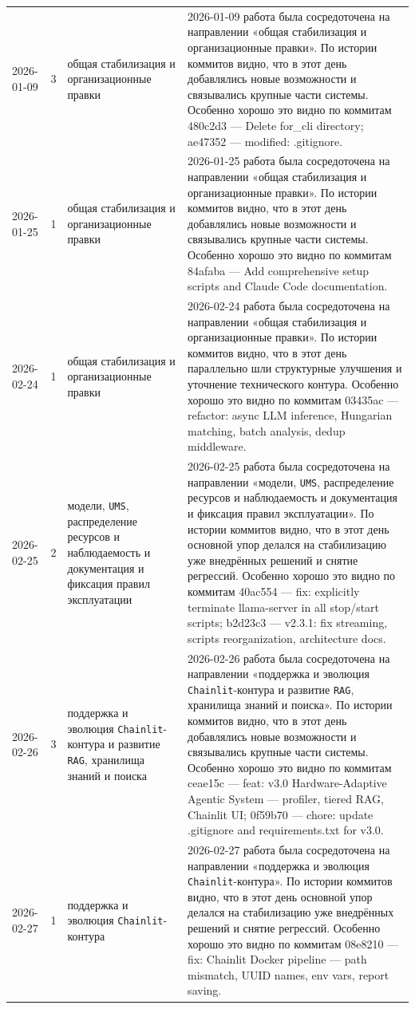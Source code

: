 \begin{longtable}{p{} p{} p{} p{}}
2026-01-09 & 3 & общая стабилизация и организационные правки & 2026-01-09 работа была сосредоточена на направлении «общая стабилизация и организационные правки». По истории коммитов видно, что в этот день добавлялись новые возможности и связывались крупные части системы. Особенно хорошо это видно по коммитам 480c2d3 — Delete for\_cli directory; ae47352 — modified:   .gitignore. \\
2026-01-25 & 1 & общая стабилизация и организационные правки & 2026-01-25 работа была сосредоточена на направлении «общая стабилизация и организационные правки». По истории коммитов видно, что в этот день добавлялись новые возможности и связывались крупные части системы. Особенно хорошо это видно по коммитам 84afaba — Add comprehensive setup scripts and Claude Code documentation. \\
2026-02-24 & 1 & общая стабилизация и организационные правки & 2026-02-24 работа была сосредоточена на направлении «общая стабилизация и организационные правки». По истории коммитов видно, что в этот день параллельно шли структурные улучшения и уточнение технического контура. Особенно хорошо это видно по коммитам 03435ac — refactor: async LLM inference, Hungarian matching, batch analysis, dedup middleware. \\
2026-02-25 & 2 & модели, \texttt{UMS}, распределение ресурсов и наблюдаемость и документация и фиксация правил эксплуатации & 2026-02-25 работа была сосредоточена на направлении «модели, \texttt{UMS}, распределение ресурсов и наблюдаемость и документация и фиксация правил эксплуатации». По истории коммитов видно, что в этот день основной упор делался на стабилизацию уже внедрённых решений и снятие регрессий. Особенно хорошо это видно по коммитам 40ac554 — fix: explicitly terminate llama-server in all stop/start scripts; b2d23c3 — v2.3.1: fix streaming, scripts reorganization, architecture docs. \\
2026-02-26 & 3 & поддержка и эволюция \texttt{Chainlit}-контура и развитие \texttt{RAG}, хранилища знаний и поиска & 2026-02-26 работа была сосредоточена на направлении «поддержка и эволюция \texttt{Chainlit}-контура и развитие \texttt{RAG}, хранилища знаний и поиска». По истории коммитов видно, что в этот день добавлялись новые возможности и связывались крупные части системы. Особенно хорошо это видно по коммитам ceae15c — feat: v3.0 Hardware-Adaptive Agentic System — profiler, tiered RAG, Chainlit UI; 0f59b70 — chore: update .gitignore and requirements.txt for v3.0. \\
2026-02-27 & 1 & поддержка и эволюция \texttt{Chainlit}-контура & 2026-02-27 работа была сосредоточена на направлении «поддержка и эволюция \texttt{Chainlit}-контура». По истории коммитов видно, что в этот день основной упор делался на стабилизацию уже внедрённых решений и снятие регрессий. Особенно хорошо это видно по коммитам 08e8210 — fix: Chainlit Docker pipeline — path mismatch, UUID names, env vars, report saving. \\

\end{longtable}
